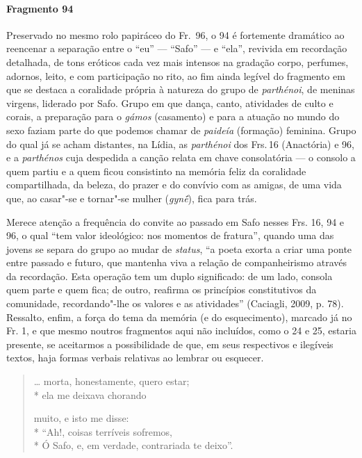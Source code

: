 {\paragraph{Fragmento 94}

{\small Preservado no mesmo rolo papiráceo do Fr.~96, o 94 é fortemente dramático ao
reencenar a separação entre o “eu” --- ``Safo” --- e “ela”, revivida em
recordação detalhada, de tons eróticos cada vez mais intensos na
gradação corpo, perfumes, adornos, leito, e com participação no rito,
ao fim ainda legível do fragmento em que se destaca a coralidade própria à natureza do grupo de \textit{parthénoi}, de meninas virgens, liderado por Safo. Grupo em que dança, canto, atividades de culto e corais, a preparação para o \textit{gámos} (casamento) e para a atuação no mundo do sexo faziam parte do que podemos chamar de \textit{paideía} (formação) feminina. Grupo do qual já se acham distantes, na Lídia, as \textit{parthénoi} dos Frs.\,16 (Anactória) e 96, e a \textit{parthénos} cuja despedida a canção relata em chave consolatória --- o consolo a quem partiu e a quem ficou consistinto na memória feliz da coralidade compartilhada, da beleza, do prazer e do convívio com as amigas, de uma vida que, ao casar"-se e tornar"-se mulher (\textit{gynḗ}), fica para trás.

Merece atenção a frequência do convite ao passado em Safo nesses Frs. 16, 94 e 96, o qual “tem valor ideológico: nos momentos de fratura”, quando uma das jovens se separa do grupo ao mudar de \textit{status}, “a poeta exorta a criar uma ponte entre passado e futuro, que mantenha viva a relação de companheirismo através da recordação. Esta operação tem um duplo significado: de um lado, consola quem parte e quem fica; de outro, reafirma os princípios constitutivos da comunidade, recordando"-lhe os valores e as atividades” (Caciagli, 2009, p. 78).
Ressalto, enfim, a força do tema da memória (e do esquecimento), marcado já no Fr. 1, e que mesmo noutros fragmentos aqui não incluídos, como o 24 e 25, estaria presente, se aceitarmos a possibilidade de que, em seus respectivos e ilegíveis textos, haja formas verbais relativas ao lembrar ou esquecer.
}

\begin{verse}
\ldots{} morta, honestamente, quero estar;\\*
ela me deixava chorando

muito, e isto me disse:\\*
“Ah!, coisas terríveis sofremos,\\*
Ó Safo, e, em verdade, contrariada te deixo”.


\end{verse}}
